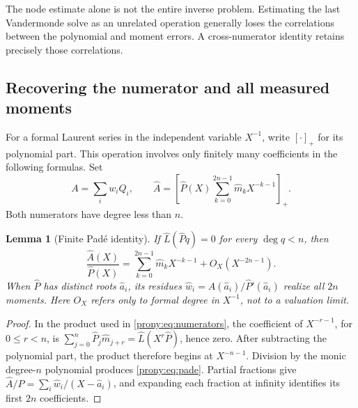 \documentclass[11pt,letterpaper]{article}
\newtheorem{lemma}[theorem]{Lemma}
\theoremstyle{definition}
\theoremstyle{remark}
\newcommand{\Ph}{\widehat P}
\newcommand{\Ah}{\widehat A}
\newcommand{\ah}{\widehat a}
\newcommand{\wh}{\widehat w}
\newcommand{\mh}{\widehat m}
\newcommand{\Lh}{\widehat L}
\begin{document}
The node estimate alone is not the entire inverse problem. Estimating the
last Vandermonde solve as an unrelated operation generally loses the
correlations between the polynomial and moment errors. A cross-numerator
identity retains precisely those correlations.

\subsection{Recovering the numerator and all measured moments}
For a formal Laurent series in the independent variable $X^{-1}$, write
$[\cdot]_+$ for its polynomial part. This operation involves only finitely
many coefficients in the following formulas. Set
\begin{equation}\label{prony:eq:numerators}
 A=\sum_iw_iQ_i,
 \qquad
 \Ah=\left[\Ph(X)\sum_{k=0}^{2n-1}\mh_kX^{-k-1}\right]_+.
\end{equation}
Both numerators have degree less than $n$.

\begin{lemma}[Finite Pad\'e identity]\label{prony:lem:pade}
If $\Lh(\Ph q)=0$ for every $\deg q<n$, then
\begin{equation}\label{prony:eq:pade}
 \frac{\Ah(X)}{\Ph(X)}
 =\sum_{k=0}^{2n-1}\mh_kX^{-k-1}+O_X(X^{-2n-1}).
\end{equation}
When $\Ph$ has distinct roots $\ah_i$, its residues
$\wh_i=\Ah(\ah_i)/\Ph'(\ah_i)$ realize all $2n$ moments.
Here $O_X$ refers only to formal degree in $X^{-1}$, not to a valuation limit.
\end{lemma}
\begin{proof}
In the product used in \eqref{prony:eq:numerators}, the coefficient of $X^{-r-1}$,
for $0\le r<n$, is
$\sum_{j=0}^n\Ph_j\mh_{j+r}=\Lh(X^r\Ph)$, hence zero.
After subtracting the polynomial part, the product therefore begins at
$X^{-n-1}$. Division by the monic degree-$n$ polynomial produces
\eqref{prony:eq:pade}. Partial fractions give
$\Ah/\Ph=\sum_i\wh_i/(X-\ah_i)$, and expanding each fraction at infinity
identifies its first $2n$ coefficients.
\end{proof}
\end{document}
